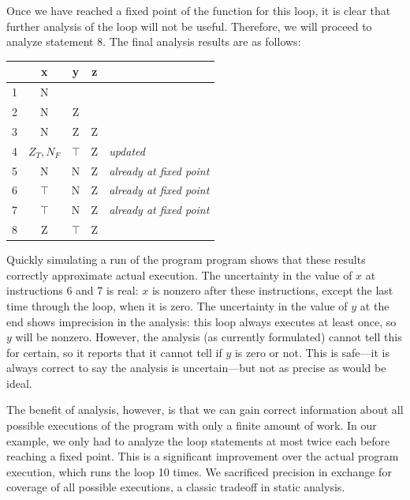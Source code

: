 \documentclass[11pt]{article}
\begin{document}
Once we have reached a fixed point of the function for this loop, it is clear
that further analysis of the loop will not be useful.  Therefore, we will
proceed to analyze statement 8.  The final analysis results are as follows:

\tablespace
\begin{center}
\begin{tabular}{r | c c c l}

  & x & y & z \\
\hline
1 & N &   &   \\
2 & N & Z &   \\
3 & N & Z & Z \\
4 & $Z_T,N_F$ & $\top$ & Z & \textit{updated} \\
5 & N & N & Z & \textit{already at fixed point} \\
6 & $\top$ & N & Z & \textit{already at fixed point} \\
7 & $\top$ & N & Z & \textit{already at fixed point} \\
8 & Z & $\top$ & Z \\
\end{tabular}
\end{center}
\tablespace

Quickly simulating a run of the program program shows that these results
correctly approximate actual execution.  The uncertainty in the value of $x$ at
instructions 6 and 7 is real: $x$ is nonzero after these instructions, except
the last time through the loop, when it is zero.  The uncertainty in the value
of $y$ at the end shows imprecision in the analysis: this loop
always executes at least once, so $y$ will be nonzero.  However, the analysis
(as currently formulated) cannot tell this for certain, 
so it reports that it cannot tell if $y$ is zero or not.  This is
safe---it is always correct to say the analysis is uncertain---but not as
precise as would be ideal.

The benefit of analysis, however, is that we can gain correct information about
all possible executions of the program with only a finite amount of work.  In
our example, we only had to analyze the loop statements at most twice each
before reaching a fixed point. This is a significant improvement over the actual
program execution, which runs the loop 10
times.  We sacrificed precision in exchange for
coverage of all possible executions, a classic tradeoff in static analysis.
\end{document}
